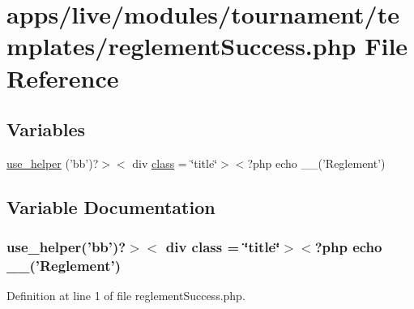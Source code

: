 \hypertarget{live_2modules_2tournament_2templates_2reglement_success_8php}{\section{apps/live/modules/tournament/templates/reglement\-Success.php File Reference}
\label{live_2modules_2tournament_2templates_2reglement_success_8php}
}
\subsection*{Variables}
\begin{DoxyCompactItemize}
\item 
\hyperlink{live_2modules_2tournament_2templates_2reglement_success_8php_ad20740d877696f45a78b0497ff807965}{use\-\_\-helper} ('bb')?$>$$<$ div \hyperlink{live_2modules_2news_2templates_2__actualitelight_8php_a185c73c6507391d1eb38c776b68ce96d}{class} = \char`\"{}title\char`\"{}$>$$<$?php echo \-\_\-\-\_\-('Reglement')
\end{DoxyCompactItemize}


\subsection{Variable Documentation}
\hypertarget{live_2modules_2tournament_2templates_2reglement_success_8php_ad20740d877696f45a78b0497ff807965}{
\subsubsection[{use\-\_\-helper}]{\setlength{\rightskip}{0pt plus 5cm}use\-\_\-helper('bb')?$>$$<$ div {\bf class} = \char`\"{}title\char`\"{}$>$$<$?php echo \-\_\-\-\_\-('Reglement')}}\label{live_2modules_2tournament_2templates_2reglement_success_8php_ad20740d877696f45a78b0497ff807965}


Definition at line 1 of file reglement\-Success.\-php.

